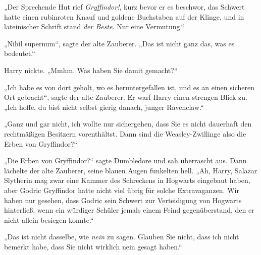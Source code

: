 „Der Sprechende Hut rief \emph{Gryffindor!}, kurz bevor er es beschwor, das Schwert hatte einen rubinroten Knauf und goldene Buchstaben auf der Klinge, und in lateinischer Schrift stand \emph{der Beste}. Nur eine Vermutung.“

„Nihil supernum“, sagte der alte Zauberer. „Das ist nicht ganz das, was es bedeutet.“

Harry nickte. „Mmhm. Was haben Sie damit gemacht?“

„Ich habe es von dort geholt, wo es heruntergefallen ist, und es an einen sicheren Ort gebracht“, sagte der alte Zauberer. Er warf Harry einen strengen Blick zu. „Ich hoffe, du bist nicht selbst gierig danach, junger Ravenclaw.“

„Ganz und gar nicht, ich wollte nur sichergehen, dass Sie es nicht dauerhaft den rechtmäßigen Besitzern vorenthältst. Dann sind die Weasley-Zwillinge also die Erben von Gryffindor?“

„Die Erben von Gryffindor?“ sagte Dumbledore und sah überrascht aus.
Dann lächelte der alte Zauberer, seine blauen Augen funkelten hell.
„Ah, Harry, Salazar Slytherin mag zwar eine Kammer des Schreckens in Hogwarts eingebaut haben, aber Godric Gryffindor hatte nicht viel übrig für solche Extravaganzen. Wir haben nur gesehen, dass Godric sein Schwert zur Verteidigung von Hogwarts hinterließ, wenn ein würdiger Schüler jemals einem Feind gegenüberstand, den er nicht allein besiegen konnte.“

„Das ist nicht dasselbe, wie \emph{nein} zu sagen. Glauben Sie nicht, dass ich nicht bemerkt habe, dass Sie nicht wirklich nein gesagt haben.“

